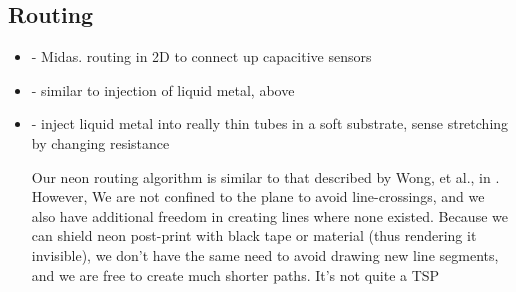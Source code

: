 \subsection{Routing}
\begin{itemize}
\item \cite{Savage-midas} - Midas.  routing in 2D to connect up capacitive sensors
\item \cite{Park-microchannels} - similar to injection of liquid metal, above
\item \cite{Majidi-curvature} - inject liquid metal into really thin tubes in a soft substrate, sense stretching by changing resistance

Our neon routing algorithm is similar to that described by Wong, et al., in \cite{Wong-continuousline}.  However, We are not confined to the plane to avoid line-crossings, and we also have additional freedom in creating lines where none existed.  Because we can shield neon post-print with black tape or material (thus rendering it invisible), we don't have the same need to avoid drawing new line segments, and we are free to create much shorter paths.  It's not quite a TSP
\end{itemize}